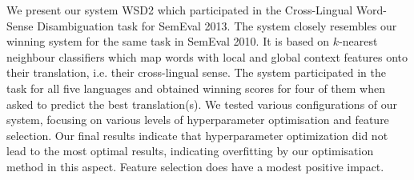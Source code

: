 We present our system WSD2 which participated in the Cross-Lingual Word-Sense Disambiguation task for SemEval 2013. The system closely resembles our winning
 system for the same task in SemEval 2010. It is based on $k$-nearest neighbour
 classifiers which map words with local and global context features onto their
 translation, i.e. their cross-lingual sense. The system participated in the
 task for all five languages and obtained winning scores for four of them when
 asked to predict the best translation(s). We tested various configurations of
 our system, focusing on various levels of hyperparameter optimisation and
 feature selection. Our final results indicate that hyperparameter optimization
 did not lead to the most optimal results, indicating overfitting by our
 optimisation method in this aspect. Feature selection does have a modest
 positive impact.

